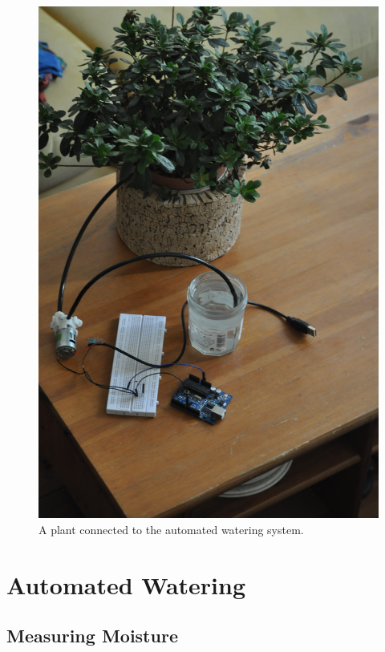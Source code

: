 \documentclass[conference]{IEEEtran}
\begin{document}
\begin{figure}
    \centering
    \includegraphics[width=\columnwidth]{final_plant}
    \caption{A plant connected to the automated watering system.}
    \label{fig:final_plant}
\end{figure}

\section{Automated Watering}
\label{sec:automated}

\subsection{Measuring Moisture}
\end{document}
